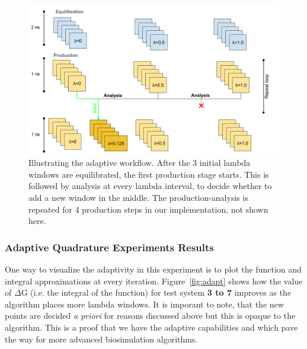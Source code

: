 \begin{figure}
  \centering
   \includegraphics[width=\columnwidth]{figures/Adaptive_TIES_1.png}
  \caption{Illustrating the adaptive workflow. After the 3 initial lambda 
  windows are equilibrated, the first production stage starts. 
  This is followed by analysis at every lambda interval, to decide whether 
  to add a new window in the middle. The production-analysis is repeated 
  for 4 production steps in our implementation, not shown here.}
\label{fig:adaptive_TIES}
\end{figure}

\subsubsection{Adaptive Quadrature Experiments Results}

One way to visualize the adaptivity in this experiment is to plot the function
and integral approximations at every iteration. Figure~\ref{fig:adapt} shows
how the value of $\Delta$G (i.e. the integral of the function) for test system 
\textbf{3 to 7} improves as the
algorithm places more lambda windows. It is imporant to note, that the new
points are decided {\it a priori} for reasons discussed above but this is
opaque to the algorithm. This is a proof that we have the adaptive capabilities
and which pave the way for more advanced biosimulation algorithms.

